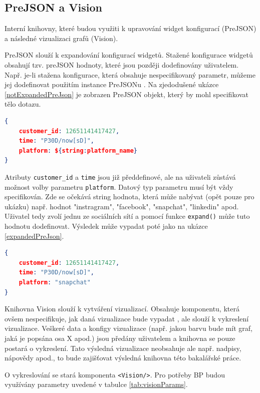 \documentclass[czech, bc, kiv, he, iso690numb]{fasthesis}
\begin{document}
\subsection{PreJSON a Vision}

Interní knihovny, které budou využiti k upravování widget konfigurací (PreJSON) a následné vizualizaci grafů (Vision).

PreJSON slouží k expandování konfigurací widgetů. Stažené konfigurace widgetů obsahují tzv. preJSON hodnoty, které jsou později dodefinovány uživatelem. Např. je-li stažena konfigurace, která obsahuje
nespecifikovaný parametr, můžeme jej dodefinovat použitím instance PreJSONu \cite{preJSONDocs}. Na zjedodušené ukázce \ref{notExpandedPreJson} je zobrazen PreJSON objekt, který by mohl specifikovat tělo dotazu. 

\begin{lstlisting}[language=json, caption={Neexpandovaný PreJSON objekt}, label=notExpandedPreJson]
{
	customer_id: 12651141417427,
	time: "P30D/now[sD]",
	platform: ${string:platform_name}
}
\end{lstlisting}
		
Atributy \texttt{customer\_id} a \texttt{time} jsou již předdefinové, ale na uživateli zůstává možnost volby parametru \texttt{platform}. Datový typ parametru musí být vždy specifikován.
Zde se očekává string hodnota, která může nabývat (opět pouze pro ukázku) např. hodnot "instragram", "facebook", "snapchat", "linkedin" apod. Uživatel tedy zvolí jednu ze sociálních sítí
a pomocí funkce \texttt{expand()} může tuto hodnotu dodefinovat. Výsledek může vypadat poté jako na ukázce \ref{expandedPreJson}.

\begin{lstlisting}[language=json, caption={Expandovaný PreJSON objekt}, label=expandedPreJson]
{
	customer_id: 12651141417427,
	time: "P30D/now[sD]",
	platform: "snapchat"
}
\end{lstlisting}

Knihovna Vision slouží k vytváření vizualizací. Obsahuje komponentu, která ovšem nespecifikuje, jak daná vizualizace bude vypadat \cite{visionDocs}, ale slouží k vykreslení vizualizace. 
Veškeré data a konfigy vizualizace (např. jakou barvu bude mít graf, jaká je popsána osa X apod.) jsou předány uživatelem a knihovna se pouze postará o vykreslení. Tato výsledná vizualizace 
neobsahuje ale např. nadpisy, nápovědy apod., to bude zajišťovat výsledná knihovna této bakalářské práce.

O vykreslování se stará komponenta \texttt{<Vision/>}. Pro potřeby BP budou využívány parametry uvedené v tabulce \ref{tab:visionParams}.
\end{document}
